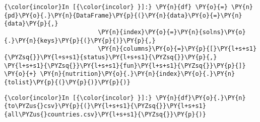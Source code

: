     \begin{Verbatim}[commandchars=\\\{\}]
{\color{incolor}In [{\color{incolor} }]:} \PY{n}{df} \PY{o}{=} \PY{n}{pd}\PY{o}{.}\PY{n}{DataFrame}\PY{p}{(}\PY{n}{data}\PY{o}{=}\PY{n}{data}\PY{p}{,}
                          \PY{n}{index}\PY{o}{=}\PY{n}{solns}\PY{o}{.}\PY{n}{keys}\PY{p}{(}\PY{p}{)}\PY{p}{,}
                          \PY{n}{columns}\PY{o}{=}\PY{p}{[}\PY{l+s+s1}{\PYZsq{}}\PY{l+s+s1}{status}\PY{l+s+s1}{\PYZsq{}}\PY{p}{,} \PY{l+s+s1}{\PYZsq{}}\PY{l+s+s1}{fun}\PY{l+s+s1}{\PYZsq{}}\PY{p}{]} \PY{o}{+} \PY{n}{nutrition}\PY{o}{.}\PY{n}{index}\PY{o}{.}\PY{n}{tolist}\PY{p}{(}\PY{p}{)}\PY{p}{)}
\end{Verbatim}


    \begin{Verbatim}[commandchars=\\\{\}]
{\color{incolor}In [{\color{incolor} }]:} \PY{n}{df}\PY{o}{.}\PY{n}{to\PYZus{}csv}\PY{p}{(}\PY{l+s+s1}{\PYZsq{}}\PY{l+s+s1}{all\PYZus{}countries.csv}\PY{l+s+s1}{\PYZsq{}}\PY{p}{)}
\end{Verbatim}



    
    
    
